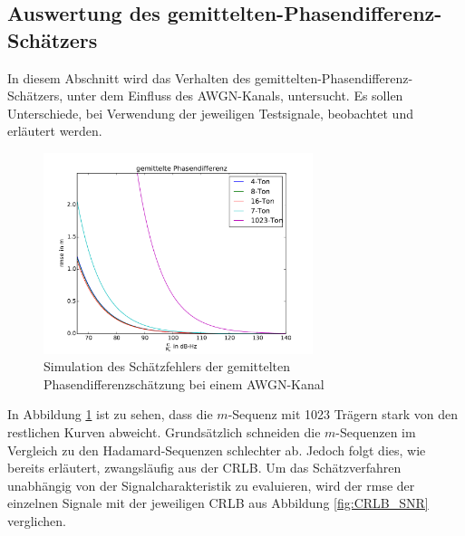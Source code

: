 \subsection{Auswertung des gemittelten-Phasendifferenz-Schätzers}
\label{chap5.1.1:gemittelter Phasendifferenz Schätzer}
In diesem Abschnitt wird das Verhalten des gemittelten-Phasendifferenz-Schätzers, unter dem Einfluss des \gls{AWGN}-Kanals, untersucht. Es sollen Unterschiede, bei Verwendung der jeweiligen Testsignale, beobachtet und erläutert werden. 

\begin{figure}[htbp]
	\centering
	\includegraphics[width = 0.7\textwidth]{images/GemitteltePhasendiff_varianz}
	\caption{Simulation des Schätzfehlers der gemittelten Phasendifferenzschätzung bei einem \gls{AWGN}-Kanal}
	\label{fig:gemitteltePhasendiff_varianz}
\end{figure}

In Abbildung \ref{fig:gemitteltePhasendiff_varianz} ist zu sehen, dass die $m$-Sequenz mit 1023 Trägern stark von den restlichen Kurven abweicht. Grundsätzlich schneiden die $m$-Sequenzen im Vergleich zu den Hadamard-Sequenzen schlechter ab. Jedoch folgt dies, wie bereits erläutert, zwangsläufig aus der \gls{CRLB}.  
Um das Schätzverfahren unabhängig von der Signalcharakteristik zu evaluieren, wird der \gls{rmse} der einzelnen Signale mit der jeweiligen \gls{CRLB} aus Abbildung \ref{fig:CRLB_SNR} verglichen.

